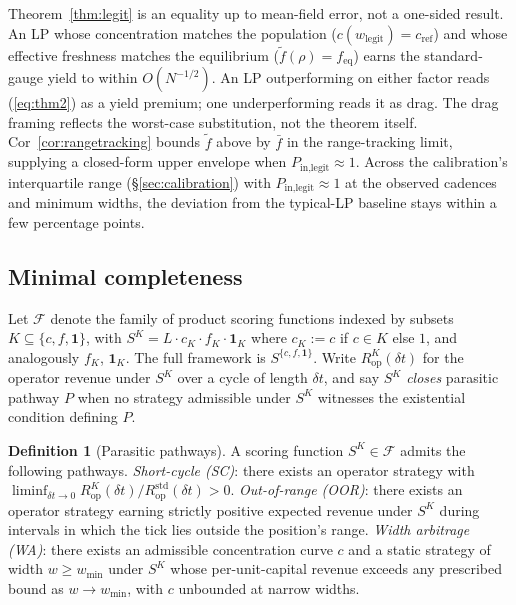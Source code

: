 \documentclass[11pt,a4paper]{article}
\theoremstyle{definition}
\newtheorem{definition}{Definition}
\theoremstyle{plain}
\theoremstyle{remark}
\begin{document}
Theorem~\ref{thm:legit} is an equality up to mean-field error, not a one-sided result. An LP whose concentration matches the population ($c(w_{\text{legit}}) = c_{\text{ref}}$) and whose effective freshness matches the equilibrium ($\tilde f(\rho) = f_{\text{eq}}$) earns the standard-gauge yield to within $O(N^{-1/2})$. An LP outperforming on either factor reads (\ref{eq:thm2}) as a yield premium; one underperforming reads it as drag. The drag framing reflects the worst-case substitution, not the theorem itself. Cor~\ref{cor:rangetracking} bounds $\tilde f$ above by $\bar f$ in the range-tracking limit, supplying a closed-form upper envelope when $P_{\text{in,legit}} \approx 1$. Across the calibration's interquartile range (\S\ref{sec:calibration}) with $P_{\text{in,legit}} \approx 1$ at the observed cadences and minimum widths, the deviation from the typical-LP baseline stays within a few percentage points.

\subsection{Minimal completeness}\label{sec:mincomplete}

Let $\mathcal{F}$ denote the family of product scoring functions indexed by subsets $K \subseteq \{c, f, \mathbf{1}\}$, with $S^K = L \cdot c_K \cdot f_K \cdot \mathbf{1}_K$ where $c_K := c$ if $c \in K$ else $1$, and analogously $f_K$, $\mathbf{1}_K$. The full framework is $S^{\{c, f, \mathbf{1}\}}$. Write $R^K_{\text{op}}(\delta t)$ for the operator revenue under $S^K$ over a cycle of length $\delta t$, and say $S^K$ \emph{closes} parasitic pathway $P$ when no strategy admissible under $S^K$ witnesses the existential condition defining $P$.

\begin{definition}[Parasitic pathways]\label{def:pathways}
A scoring function $S^K \in \mathcal{F}$ admits the following pathways. \emph{Short-cycle (SC)}: there exists an operator strategy with $\liminf_{\delta t \to 0} R^K_{\text{op}}(\delta t) / R^{\text{std}}_{\text{op}}(\delta t) > 0$. \emph{Out-of-range (OOR)}: there exists an operator strategy earning strictly positive expected revenue under $S^K$ during intervals in which the tick lies outside the position's range. \emph{Width arbitrage (WA)}: there exists an admissible concentration curve $c$ and a static strategy of width $w \geq w_{\min}$ under $S^K$ whose per-unit-capital revenue exceeds any prescribed bound as $w \to w_{\min}$, with $c$ unbounded at narrow widths.
\end{definition}
\end{document}
